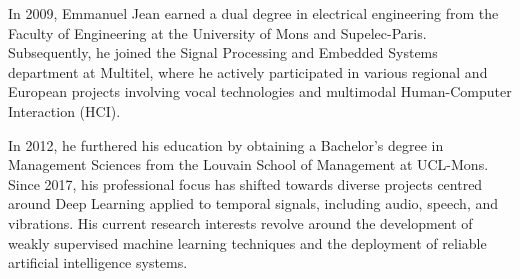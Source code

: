 In 2009, Emmanuel Jean earned a dual degree in electrical engineering from the Faculty of Engineering at the University of Mons and Supelec-Paris. Subsequently, he joined the Signal Processing and Embedded Systems department at Multitel, where he actively participated in various regional and European projects involving vocal technologies and multimodal Human-Computer Interaction (HCI).

In 2012, he furthered his education by obtaining a Bachelor's degree in Management Sciences from the Louvain School of Management at UCL-Mons. Since 2017, his professional focus has shifted towards diverse projects centred around Deep Learning applied to temporal signals, including audio, speech, and vibrations. His current research interests revolve around the development of weakly supervised machine learning techniques and the deployment of reliable artificial intelligence systems.
